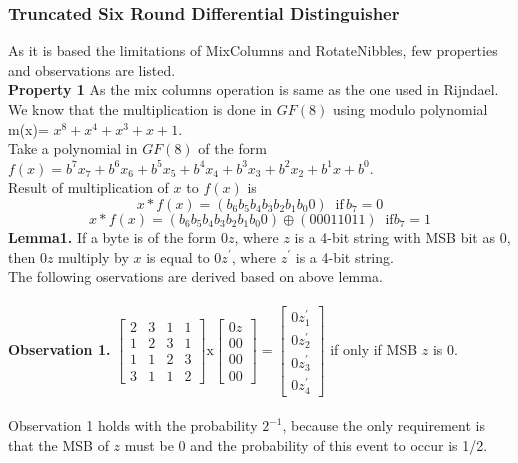 \documentclass[preprint]{transcrypto}
\begin{document}
\subsubsection{Truncated Six Round Differential Distinguisher}
As it is based the limitations of MixColumns and RotateNibbles, few properties and observations are listed.\\
\textbf{Property 1} As the mix columns operation is same as the one used in Rijndael. We know that the multiplication is done in $GF(8)$ using modulo polynomial m(x)= $x^{8} + x^{4} + x^{3} + x + 1$.\\
Take a polynomial in $GF(8)$ of the form $f(x) = b^{7} x_{7} + b^{6} x_{6} + b^{5} x_{5} + b^{4} x_{4} + b^{3} x_{3} + b^{2} x_{2} + b^{1} x + b^{0}$.\\
Result of multiplication of $x$ to $f(x)$ is\\
$$x * f(x) = (b_{6} b_{5} b_{4} b_{3} b_{2} b_{1} b_{0} 0)\;\; \text{if}\,b_{7}=0$$ 
$$ x * f(x) = (b_{6} b_{5} b_{4} b_{3} b_{2} b_{1} b_{0} 0) \oplus (00011011) \;\; \text{if} b_{7} = 1$$ 
\textbf{Lemma1.} If a byte is of the form $0z$, where $z$ is a 4-bit string
with MSB bit as 0, then $0z$ multiply by $x$ is equal to $0z^{'}$, where $z ^{'}$
is a 4-bit string.\\
The following oservations are derived based on above lemma.\\ \\
\textbf{Observation 1.} 
\begin{math}
\begin{bmatrix}
2&3&1&1\\
1&2&3&1\\
1&1&2&3\\
3&1&1&2
\end{bmatrix}
\text{x}
\begin{bmatrix}
0z \\
00 \\
00 \\
00 
\end{bmatrix} = 
\begin{bmatrix}
0z^{'}_{1} \\
0z^{'}_{2} \\
0z^{'}_{3} \\
0z^{'}_{4} 
\end{bmatrix}
\end{math} if only if MSB $z$ is 0. \\ \\
Observation 1 holds with the probability $2^{-1}$, because the only requirement is that the MSB of $z$ must be 0 and the probability of this event to occur is 1/2.\\ \\
\end{document}

